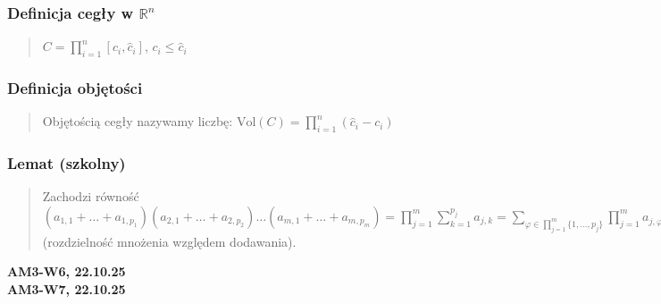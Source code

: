 \documentclass[10pt,a4paper]{article}
\newcommand{\zagadnienie}[3]{%
    \clearpage %
    \noindent\textbf{#1} #2\\
    #3
}
\begin{document}
{    \subsubsection*{Definicja cegły w $\mathbb{R}^n$}
    \begin{quote}
    $C = \prod_{i=1}^n [c_i, \hat{c}_i]$, $c_i \le \hat{c}_i$
    \end{quote}

    \subsubsection*{Definicja objętości}
    \begin{quote}
    Objętością cegły nazywamy liczbę:
    $\mathrm{Vol}(C) = \prod_{i=1}^n (\hat{c}_i - c_i)$
    
\end{quote}
    \subsubsection*{Lemat (szkolny)}
    \begin{quote}
    Zachodzi równość \\
    $(a_{1,1} + \dots + a_{1, p_1})(a_{2,1} + \dots + a_{2, p_2})\dots(a_{m,1} + \dots + a_{m, p_m}) = \prod_{j=1}^m \sum_{k=1}^{p_j} a_{j,k} = \sum_{\varphi \in \prod_{j=1}^m \{1, \dots, p_j\}} \prod_{j=1}^m a_{j, \varphi(j)}$ \\
    (rozdzielność mnożenia względem dodawania).
    \end{quote}

}
\zagadnienie{AM3-W6, 22.10.25}{}
{
}
\zagadnienie{AM3-W7, 22.10.25}{}
{
}
\end{document}
